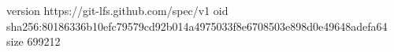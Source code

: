 version https://git-lfs.github.com/spec/v1
oid sha256:80186336b10efc79579cd92b014a4975033f8e6708503e898d0e49648adefa64
size 699212
